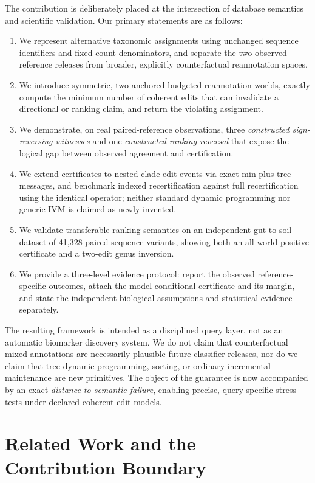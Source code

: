 \documentclass[conference]{IEEEtran}
\begin{document}
The contribution is deliberately placed at the intersection of database semantics and scientific validation. Our primary statements are as follows:
\begin{enumerate}[leftmargin=*,nosep]
\item We represent alternative taxonomic assignments using unchanged sequence identifiers and fixed count denominators, and separate the two observed reference releases from broader, explicitly counterfactual reannotation spaces.
\item We introduce symmetric, two-anchored budgeted reannotation worlds, exactly compute the minimum number of coherent edits that can invalidate a directional or ranking claim, and return the violating assignment.
\item We demonstrate, on real paired-reference observations, three \emph{constructed sign-reversing witnesses} and one \emph{constructed ranking reversal} that expose the logical gap between observed agreement and certification.
\item We extend certificates to nested clade-edit events via exact min-plus tree messages, and benchmark indexed recertification against full recertification using the identical operator; neither standard dynamic programming nor generic IVM is claimed as newly invented.
\item We validate transferable ranking semantics on an independent gut-to-soil dataset of 41,328 paired sequence variants, showing both an all-world positive certificate and a two-edit genus inversion.
\item We provide a three-level evidence protocol: report the observed reference-specific outcomes, attach the model-conditional certificate and its margin, and state the independent biological assumptions and statistical evidence separately.
\end{enumerate}

The resulting framework is intended as a disciplined query layer, not as an automatic biomarker discovery system. We do not claim that counterfactual mixed annotations are necessarily plausible future classifier releases, nor do we claim that tree dynamic programming, sorting, or ordinary incremental maintenance are new primitives. The object of the guarantee is now accompanied by an exact \emph{distance to semantic failure}, enabling precise, query-specific stress tests under declared coherent edit models.

\section{Related Work and the Contribution Boundary}
\label{sec:related}
\end{document}
